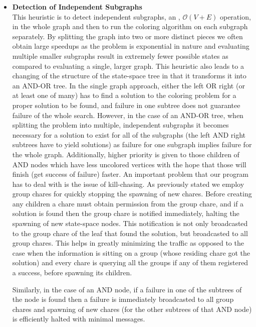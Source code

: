 \documentclass[10pt,twoside]{article}
\begin{document}
\begin{itemize}
  \item \textbf{Detection of Independent Subgraphs}     \\
This heuristic is to detect independent subgraphs, an , $\mathcal{O}(V+E)$
operation, in the whole graph and then to run the coloring algorithm on each
subgraph separately.  By splitting the graph into two or more distinct pieces
we often obtain large speedups as the problem is exponential in nature and
evaluating multiple smaller subgraphs result in extremely fewer possible states
as compared to evaluating a single, larger graph. This heuristic also leads to
a changing of the structure of the state-space tree in that it transforms it
into an AND-OR tree. In the single graph approach, either the left OR right (or
    at least one of many) has to find a solution to the coloring problem for a
proper solution to be found, and failure in one subtree does not guarantee
failure of the whole search. However, in the case of an AND-OR tree, when
splitting the problem into multiple, independent subgraphs it becomes necessary
for a solution to exist for all of the subgraphs (the left AND right subtrees
    have to yield solutions) as failure for one subgraph implies failure for
  the whole graph. Additionally, higher priority is given to those children of
    AND nodes which have less uncolored vertices with the hope that those will finish (get success of failure) faster. 
    An important problem that our program has to deal with is the issue
    of kill-chasing. As previously stated we employ group chares for quickly
    stopping the spawning of new chares. Before creating any children a chare
    must obtain permission from the group chare, and if a solution is found
    then the group chare is notified immediately, halting the spawning of new
    state-space nodes. This notification is not only broadcasted to the group
    chare of the leaf that found the solution, but broadcasted to all group chares. This helps 
    in greatly minimizing the traffic as opposed to the case when the information is sitting on  
    a group (whose residing chare got the solution) and every chare is querying all the groups 
    if any of them registered a success, before spawning its children. 

    Similarly, in the case of an AND node, if a failure in one of the
    subtrees of the node is found then a failure is immediately broadcasted to
    all group chares and spawning of new chares (for the other subtrees of that AND node) is efficiently halted with
    minimal messages.


\end{itemize}
\end{document}
